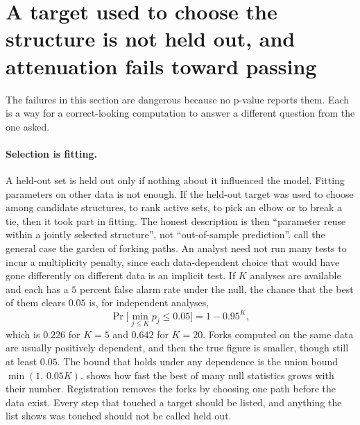 
\section{A target used to choose the structure is not held out, and attenuation fails toward passing}\label{sec:ch09:selection}

The failures in this section are dangerous because no p-value reports them. Each is a way for a correct-looking computation to answer a different question from the one asked.

\paragraph{Selection is fitting.} A held-out set is held out only if nothing about it influenced the model. Fitting parameters on other data is not enough. If the held-out target was used to choose among candidate structures, to rank active sets, to pick an elbow or to break a tie, then it took part in fitting. The honest description is then ``parameter reuse within a jointly selected structure'', not ``out-of-sample prediction''. \citet{gelmanloken2014} call the general case the garden of forking paths. An analyst need not run many tests to incur a multiplicity penalty, since each data-dependent choice that would have gone differently on different data is an implicit test. If $K$ analyses are available and each has a $5$ percent false alarm rate under the null, the chance that the best of them clears $0.05$ is, for independent analyses,
\begin{equation}
\Pr\Big[\min_{j\le K}p_j\le0.05\Big]=1-0.95^{K},
\label{eq:ch09:forking}
\end{equation}
which is $0.226$ for $K=5$ and $0.642$ for $K=20$. Forks computed on the same data are usually positively dependent, and then the true figure is smaller, though still at least $0.05$. The bound that holds under any dependence is the union bound $\min(1,\,0.05K)$.  shows how fast the best of many null statistics grows with their number. Registration removes the forks by choosing one path before the data exist. Every step that touched a target should be listed, and anything the list shows was touched should not be called held out.

